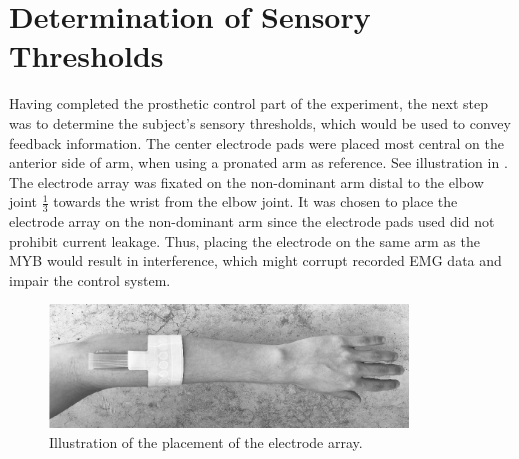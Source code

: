 
\section{Determination of Sensory Thresholds}

Having completed the prosthetic control part of the experiment, the next step was to determine the subject's sensory thresholds, which would be used to convey feedback information. The center electrode pads were placed most central on the anterior side of arm, when using a pronated arm as reference. See illustration in . The electrode array was fixated on the non-dominant arm distal to the elbow joint $\frac{1}{3}$ towards the wrist from the elbow joint. It was chosen to place the electrode array on the non-dominant arm since the electrode pads used did not prohibit current leakage. Thus, placing the electrode on the same arm as the MYB would result in interference, which might corrupt recorded EMG data and impair the control system.

\begin{figure}[H]                 
	\includegraphics[width=0.85\textwidth]{figures/elec_place}  
	\caption{Illustration of the placement of the electrode array.}
	\label{fig:meth:elec_place} 
\end{figure}


